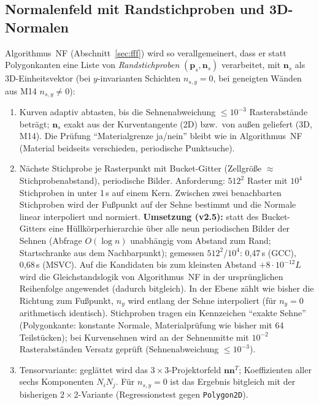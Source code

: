 \subsection{Normalenfeld mit Randstichproben und 3D-Normalen}
Algorithmus~NF (Abschnitt~\ref{sec:fff}) wird so verallgemeinert, dass er statt Polygonkanten eine Liste von
\emph{Randstichproben} $(\mathbf p_s,\mathbf n_s)$ verarbeitet, mit $\mathbf n_s$ als 3D-Einheitsvektor
(bei $y$-invarianten Schichten $n_{s,y}=0$, bei geneigten Wänden aus M14 $n_{s,y}\neq0$):
\begin{enumerate}[nosep]
  \item Kurven adaptiv abtasten, bis die Sehnenabweichung $\le10^{-3}$ Rasterabstände beträgt; $\mathbf n_s$ exakt aus
        der Kurventangente (2D) bzw.\ von außen geliefert (3D, M14). Die Prüfung \enquote{Materialgrenze ja/nein}
        bleibt wie in Algorithmus~NF (Material beidseits verschieden, periodische Punktsuche).
  \item Nächste Stichprobe je Rasterpunkt mit Bucket-Gitter (Zellgröße $\approx$ Stichprobenabstand), periodische Bilder.
        Anforderung: $512^2$ Raster mit $10^4$ Stichproben in unter 1\,s auf einem Kern.
        Zwischen zwei benachbarten Stichproben wird der Fußpunkt auf der Sehne bestimmt und die Normale linear
        interpoliert und normiert.
        \textbf{Umsetzung (v2.5):} statt des Bucket-Gitters eine Hüllkörperhierarchie über alle neun periodischen Bilder
        der Sehnen (Abfrage $O(\log n)$ unabhängig vom Abstand zum Rand; Startschranke aus dem Nachbarpunkt); gemessen
        $512^2$/$10^4$: 0,47\,s (GCC), 0,68\,s (MSVC). Auf die Kandidaten bis zum kleinsten Abstand $+8\cdot10^{-12}L$
        wird die Gleichstandslogik von Algorithmus~NF in der ursprünglichen Reihenfolge angewendet (dadurch bitgleich).
        In der Ebene zählt wie bisher die Richtung zum Fußpunkt, $n_y$ wird entlang der Sehne interpoliert
        (für $n_y=0$ arithmetisch identisch). Stichproben tragen ein Kennzeichen \enquote{exakte Sehne} (Polygonkante:
        konstante Normale, Materialprüfung wie bisher mit 64 Teilstücken); bei Kurvensehnen wird an der Sehnenmitte
        mit $10^{-2}$ Rasterabständen Versatz geprüft (Sehnenabweichung $\le10^{-3}$).
  \item Tensorvariante: geglättet wird das $3\times3$-Projektorfeld $\mathbf n\mathbf n^T$; Koeffizienten aller sechs
        Komponenten $N_iN_j$. Für $n_{s,y}=0$ ist das Ergebnis bitgleich mit der bisherigen $2\times2$-Variante
        (Regressionstest gegen \verb|Polygon2D|).
\end{enumerate}

